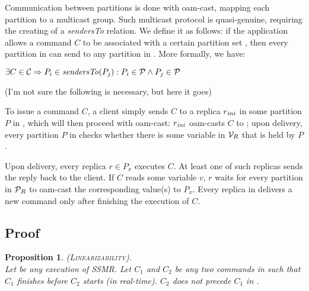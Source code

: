 \documentclass{usiinftr}
\newtheorem{props}{Proposition}
\begin{document}

Communication between partitions is done with oam-cast, mapping each partition to a multicast group. Such multicast protocol is quasi-genuine, requiring the creating of a \textit{sendersTo} relation. We define it as follows: if the application allows a command $C$ to be associated with a certain partition set \pp, then every partition in \pp can send to any partition in \pp. More formally, we have:

\begin{center}
$\exists C \in \mathcal{C} \Rightarrow P_i \in \text{\textit{sendersTo}}(P_j) : P_i \in \mathcal{P} \wedge P_j \in \mathcal{P}$
\end{center}



(I'm not sure the following is necessary, but here it goes)

To issue a command $C$, a client simply sends $C$ to a replica $r_{\text{\textit{ini}}}$ in some partition $P$ in \pp, which will then proceed with oam-cast: $r_{\text{\textit{ini}}}$ oam-casts $C$ to \pp; upon delivery, every partition $P$ in \pp checks whether there is some variable in $\mathcal{V}_R$ that is held by $P$. 

Upon delivery, every replica $r \in P_x$ executes $C$. At least one of such replicas sends the reply back to the client. If $C$ reads some variable $v$, $r$ waits for every partition in $\mathcal{P}_R$ to oam-cast the corresponding value(s) to $P_x$. Every replica in \pp delivers a new command only after finishing the execution of $C$.

\subsection{Proof}

\begin{props}
\textsc{(Linearizability)}.\\Let \ex be any execution of SSMR. Let $C_1$ and $C_2$ be any two commands in \ex such that $C_1$ finishes before $C_2$ starts (in real-time). $C_2$ does not precede $C_1$ in \ex.
\end{props}
\end{document}
